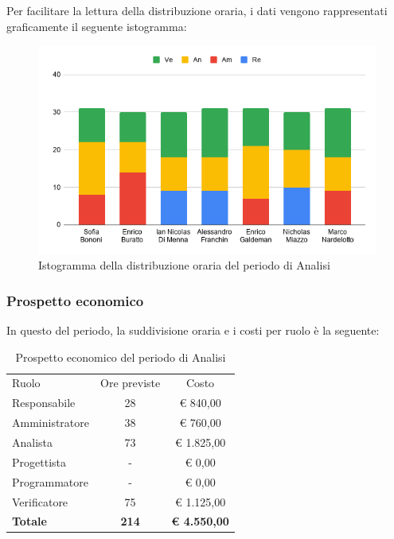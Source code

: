 \documentclass[../piano-di-progetto.tex]{subfiles}
\begin{document}
  Per facilitare la lettura della distribuzione oraria, i dati vengono rappresentati graficamente il seguente istogramma:
  \begin{figure}[H]
    \centering
    \includegraphics[width=12cm]{img/ore-analisi.png}
    \caption{Istogramma della distribuzione oraria del periodo di Analisi}
    \label{fig:ore-componente-analisi}
  \end{figure}

  \subsubsection{Prospetto economico}
  In questo del periodo, la suddivisione oraria e i costi per ruolo è la seguente:

  \begin{table}[H]
    \centering
    \begin{tabular}{lcc}
      Ruolo           & Ore previste & Costo               \\
      Responsabile    & 28           & € 840,00            \\
      Amministratore  & 38           & € 760,00            \\
      Analista        & 73           & € 1.825,00          \\
      Progettista     & -            & € 0,00              \\
      Programmatore   & -            & € 0,00              \\
      Verificatore    & 75           & € 1.125,00          \\
      \textbf{Totale} & \textbf{214} & \textbf{€ 4.550,00}
    \end{tabular}
    \caption{Prospetto economico del periodo di Analisi}
  \end{table}
\end{document}
